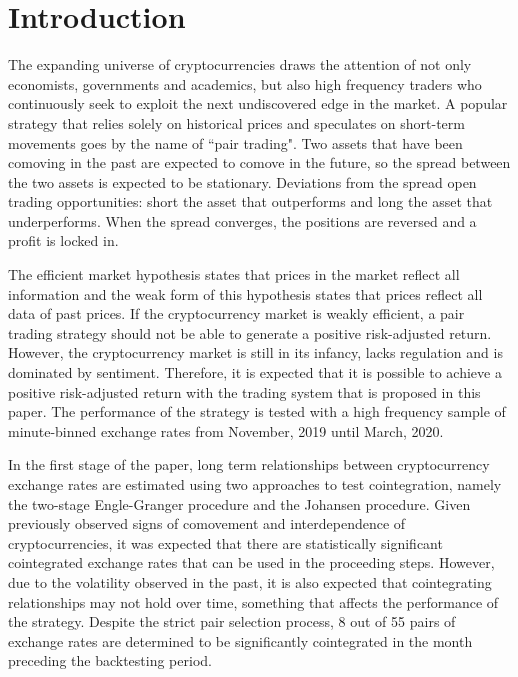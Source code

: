 \documentclass[12pt,english,authoryear]{article}
\begin{document}
\clearpage

\tableofcontents

\clearpage

\section{Introduction} \label{sec:Introduction}

The expanding universe of cryptocurrencies draws the attention of not only economists, governments and academics, but also high frequency traders who continuously seek to exploit the next undiscovered edge in the market. A popular strategy that relies solely on historical prices and speculates on short-term movements goes by the name of “pair trading". Two assets that have been comoving in the past are expected to comove in the future, so the spread between the two assets is expected to be stationary. Deviations from the spread open trading opportunities: short the asset that outperforms and long the asset that underperforms. When the spread converges, the positions are reversed and a profit is locked in. 

The efficient market hypothesis states that prices in the market reflect all information and the weak form of this hypothesis states that prices reflect all data of past prices. If the cryptocurrency market is weakly efficient, a pair trading strategy should not be able to generate a positive risk-adjusted return. However, the cryptocurrency market is still in its infancy, lacks regulation and is dominated by sentiment. Therefore, it is expected that it is possible to achieve a positive risk-adjusted return with the trading system that is proposed in this paper. The performance of the strategy is tested with a high frequency sample of minute-binned exchange rates from November, 2019 until March, 2020. 

In the first stage of the paper, long term relationships between cryptocurrency exchange rates are estimated using two approaches to test cointegration, namely the two-stage Engle-Granger \citeyear{Engle_1987} procedure and the Johansen \citeyear{Johansen_1988} procedure. Given previously observed signs of comovement and interdependence of cryptocurrencies, it was expected that there are statistically significant cointegrated exchange rates that can be used in the proceeding steps. However, due to the volatility observed in the past, it is also expected that cointegrating relationships may not hold over time, something that affects the performance of the strategy. Despite the strict pair selection process, 8 out of 55 pairs of exchange rates are determined to be significantly cointegrated in the month preceding the backtesting period.
\end{document}
